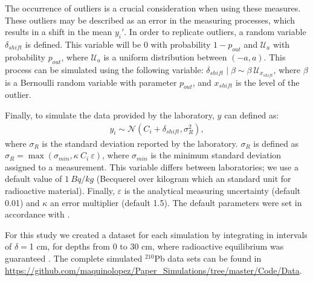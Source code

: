 \documentclass [10pt] {article}
\newcommand{\ac}{\color{red} }  %
\newcommand{\ca}{\color{black}} %
\begin{document}
The occurrence of outliers is a crucial consideration when using these measures.
These outliers may be described as an error in the measuring processes, which results in a shift in the mean $y_i'$.
In order to replicate outliers, a random variable $\delta_{shift}$ is defined.
This variable will be $0$ with probability $1-p_{out}$ and $\mathcal{U}_a$ with probability $p_{out}$, where $\mathcal{U}_a$ is a uniform distribution between $(-a,a)$.
This process can be simulated using the following variable: $\delta_{shift}\mid\beta \sim \beta\ \mathcal{U}_{x_{shift}}$, where $\beta$ is a Bernoulli random variable with parameter $p_{out}$, and $x_{shift}$ is the level of the outlier. 

Finally, to simulate the data provided by the laboratory, $y$ can defined as:   
\begin{align}
	y_i\sim\mathcal{N}\left(C_{i} + \delta_{shift}, \sigma^2_{R} \right), 
\end{align}
where $\sigma_R$ is the standard deviation reported by the laboratory. 
$\sigma_R$ is defined as $\sigma_R= \max \left(\sigma_{min}, \kappa~C_i ~\varepsilon \right)$, where $\sigma_{min}$ is the minimum standard deviation assigned to a measurement. This variable differs between laboratories; we use a default value of $1~ Bq/kg$ (Becquerel over kilogram which an standard unit for radioactive material). 
Finally, $\varepsilon$ is the analytical \ac measuring \ca uncertainty (default 0.01) and $\kappa$ an error multiplier (default 1.5).
The default parameters were set in accordance with \citet{Blaauw2018}.


For this study we created a dataset for each simulation by integrating in intervals of $\delta =$1 cm, for depths from  0 to 30 cm, where radioactive equilibrium was guaranteed \citep{Aquino2018}.
The complete simulated $^{210}$Pb data sets can be found in \url{https://github.com/maquinolopez/Paper\_Simulations/tree/master/Code/Data}.
\end{document}
